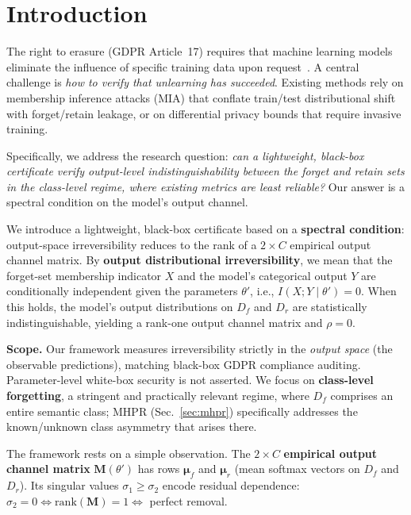 \documentclass[smallextended]{svjour3}       %
\begin{document}
\section{Introduction}
\label{sec:intro}

The right to erasure (GDPR Article~17) requires that machine learning models eliminate the influence of specific training data upon request~\cite{bourtoule2021machine,nguyen2025survey}. A central challenge is \emph{how to verify that unlearning has succeeded}. Existing methods rely on membership inference attacks (MIA) that conflate train/test distributional shift with forget/retain leakage, or on differential privacy bounds that require invasive training.

Specifically, we address the research question: \emph{can a lightweight, black-box certificate verify output-level indistinguishability between the forget and retain sets in the class-level regime, where existing metrics are least reliable?} Our answer is a spectral condition on the model's output channel.

We introduce a lightweight, black-box certificate based on a \textbf{spectral condition}: output-space irreversibility reduces to the rank of a $2\times C$ empirical output channel matrix. By \textbf{output distributional irreversibility}, we mean that the forget-set membership indicator $X$ and the model's categorical output $Y$ are conditionally independent given the parameters $\theta'$, i.e., $I(X;Y\mid\theta')=0$. When this holds, the model's output distributions on $D_f$ and $D_r$ are statistically indistinguishable, yielding a rank-one output channel matrix and $\rho=0$.

\textbf{Scope.} Our framework measures irreversibility strictly in the \emph{output space} (the observable predictions), matching black-box GDPR compliance auditing. Parameter-level white-box security is not asserted. We focus on \textbf{class-level forgetting}, a stringent and practically relevant regime, where $D_f$ comprises an entire semantic class; MHPR (Sec.~\ref{sec:mhpr}) specifically addresses the known/unknown class asymmetry that arises there.

The framework rests on a simple observation. The $2\times C$ \textbf{empirical output channel matrix} $\mathbf{M}(\theta')$ has rows $\boldsymbol{\mu}_f$ and $\boldsymbol{\mu}_r$ (mean softmax vectors on $D_f$ and $D_r$). Its singular values $\sigma_1 \ge \sigma_2$ encode residual dependence: $\sigma_2 = 0 \iff \mathrm{rank}(\mathbf{M}) = 1 \iff$ perfect removal.
\end{document}
